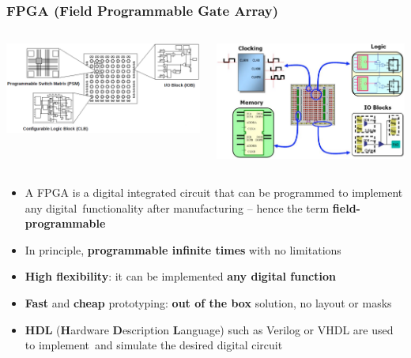 \documentclass[aspectratio=169]{beamer}
\begin{document}
		\begin{frame}
	\frametitle{FPGA  (\textbf{F}ield \textbf{P}rogrammable \textbf{G}ate \textbf{A}rray)}
	\begin{columns}
		\begin{center}
			\includegraphics[width=0.7 \textwidth]{IMG/FPGA_PARTS}
		\end{center}
		\begin{center}
			\includegraphics[width=0.6 \textwidth]{IMG/FPGA2}
		\end{center}
	\end{columns}
		\vspace{2mm}
		\begin{itemize}
			\item A FPGA is a digital integrated circuit that can be programmed to implement any digital~functionality after manufacturing – hence the term \textbf{field-programmable}
			\item In principle, \textbf{programmable infinite times} with no limitations
			\item \textbf{High flexibility}: it can be implemented \textbf{any digital function}
			\item \textbf{Fast} and \textbf{cheap} prototyping: \textbf{out of the box} solution, no layout or masks
			\item \textbf{HDL} (\textbf{H}ardware \textbf{D}escription \textbf{L}anguage) such as Verilog or VHDL are used to implement~and simulate the desired digital circuit
		\end{itemize}
	\end{frame}
\end{document}
